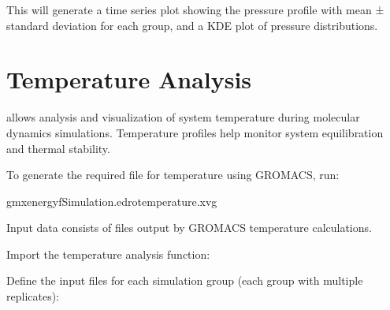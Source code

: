 \documentclass[a4paper,10pt,english]{sphinxmanual}
\begin{document}
\sphinxAtStartPar
This will generate a time series plot showing the pressure profile with mean ± standard deviation for each group, and a KDE plot of pressure distributions.


\section{Temperature Analysis}
\label{\detokenize{Input:temperature-analysis}}
\sphinxAtStartPar
{} allows analysis and visualization of system temperature during molecular dynamics simulations. Temperature profiles help monitor system equilibration and thermal stability.

\sphinxAtStartPar
To generate the required  file for temperature using GROMACS, run:

\begin{sphinxVerbatim}[commandchars=\\\{\}]
gmxenergy\PYGZhy{}fSimulation.edr\PYGZhy{}otemperature.xvg
\end{sphinxVerbatim}

\sphinxAtStartPar
Input data consists of  files output by GROMACS temperature calculations.

\sphinxAtStartPar
{}

\sphinxAtStartPar
Import the temperature analysis function:

\begin{sphinxVerbatim}[commandchars=\\\{\}]
 
\end{sphinxVerbatim}

\sphinxAtStartPar
Define the input  files for each simulation group (each group with multiple replicates):
\end{document}
